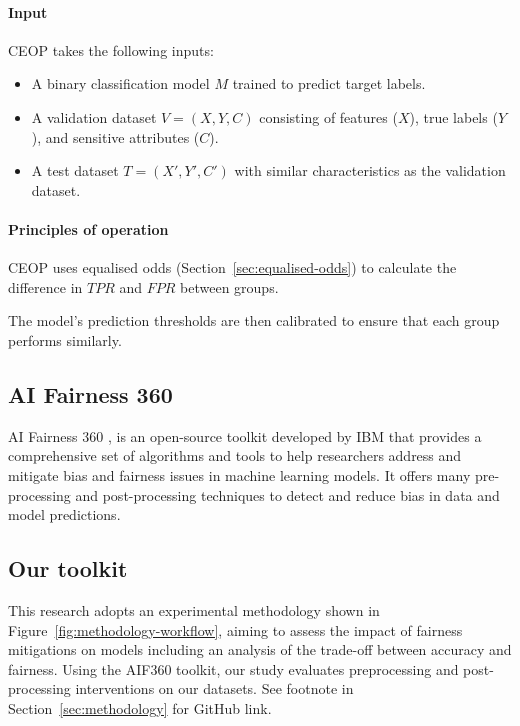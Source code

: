 \documentclass[runningheads]{llncs}
\begin{document}
\paragraph{Input} CEOP takes the following inputs:
\begin{itemize}
\item A binary classification model $M$ trained to predict target
    labels.
\item A validation dataset $V = (X, Y, C)$ consisting of features
    ($X$), true labels ($Y$), and sensitive attributes ($C$).
\item A test dataset $T = (X', Y', C')$ with similar characteristics
    as the validation dataset.
\end{itemize}

\paragraph{Principles of operation}
CEOP uses equalised odds (Section~\ref{sec:equalised-odds}) to
calculate the difference in $TPR$ and $FPR$ between groups.

The model's prediction thresholds are then calibrated to ensure that
each group performs similarly.

\subsection{AI Fairness 360}
\label{sec:ai-fairness-360}

AI Fairness 360 \cite{bellamy2018ai}, is an open-source toolkit
developed by IBM that provides a comprehensive set of algorithms and
tools to help researchers address and mitigate bias and fairness
issues in machine learning models. It offers many pre-processing and
post-processing techniques to detect and reduce bias in data and model
predictions.

\subsection{Our toolkit}
\label{sec:our-toolkit}

This research adopts an experimental methodology shown in
Figure~\ref{fig:methodology-workflow}, aiming to assess the impact of
fairness mitigations on models including an analysis of the trade-off
between accuracy and fairness. Using the AIF360 toolkit, our study
evaluates preprocessing and post-processing interventions on our
datasets. See footnote in Section~\ref{sec:methodology} for GitHub
link.
\end{document}
